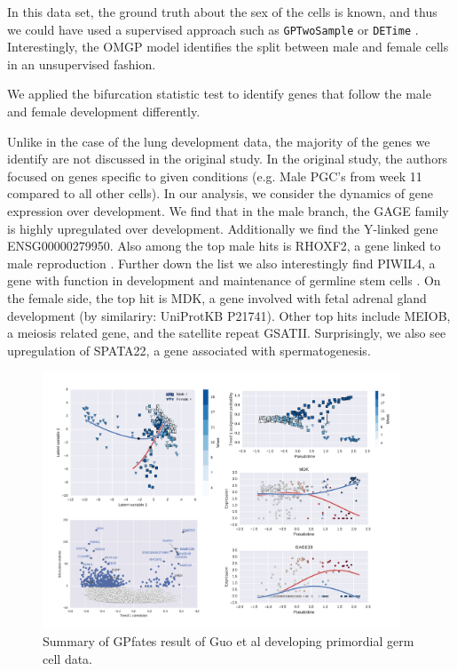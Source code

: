 In this data set, the ground truth about the sex of the cells is known, and thus we could have used a supervised approach such as \verb|GPTwoSample| \cite{Stegle2010-cb} or \verb|DETime| \cite{Yang2016-wq}. Interestingly, the OMGP model identifies the split between male and female cells in an unsupervised fashion.

We applied the bifurcation statistic test to identify genes that follow the male and female development differently.

Unlike in the case of the lung development data, the majority of the genes we identify are not discussed in the original study. In the original study, the authors focused on genes specific to given conditions (e.g. Male PGC's from week 11 compared to all other cells). In our analysis, we consider the dynamics of gene expression over development. We find that in the male branch, the GAGE family is highly upregulated over development. Additionally we find the Y-linked gene ENSG00000279950. Also among the top male hits is RHOXF2, a gene linked to male reproduction \cite{Niu2011-xq}. Further down the list we also interestingly find PIWIL4, a gene with function in development and maintenance of germline stem cells \cite{Sasaki2003-oy}. On the female side, the top hit is MDK, a gene involved with fetal adrenal gland development (by similariry: UniProtKB P21741). Other top hits include MEIOB, a meiosis related gene, and the satellite repeat GSATII. Surprisingly, we also see upregulation of SPATA22, a gene associated with spermatogenesis.

\begin{figure}
    \centering
    \includegraphics[width=0.95\textwidth]{"fig-guo"}
    \caption{Summary of GPfates result of Guo et al developing primordial germ cell data.}
    \label{fig:guo}
\end{figure}

